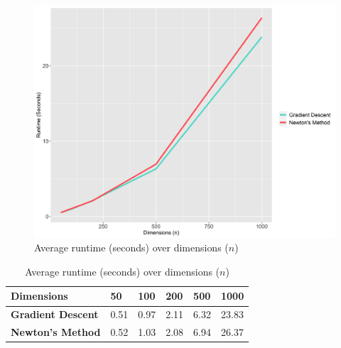 \documentclass[12pt, authoryear]{elsarticle}
\begin{document}
\begin{figure}[H]
	\centering
	\includegraphics[clip, angle=0, width=13cm]{images/time.png}
	\caption{Average runtime (seconds) over dimensions ($n$)}
	\label{fig:time}
\end{figure}

\begin{table}[H]
	\centering
	\caption{Average runtime (seconds) over dimensions ($n$)}
	\label{time_table}
	\begin{tabular}{llllll} \hline
		\textbf{Dimensions} \cellcolor{gray!25} & \textbf{50} \cellcolor{gray!25} & \textbf{100} \cellcolor{gray!25} & \textbf{200} \cellcolor{gray!25} & \textbf{500} \cellcolor{gray!25} & \textbf{1000} \cellcolor{gray!25} \\ \hline
	\textbf{Gradient Descent}  & 0.51 & 0.97 & 2.11 & 6.32 & 23.83 \\ \hline
\textbf{Newton's Method}  & 0.52 & 1.03 & 2.08 & 6.94 & 26.37 \\ \hline
	\end{tabular}
\end{table}

%
%

\appendix
\setcounter{figure}{0}
\end{document}
